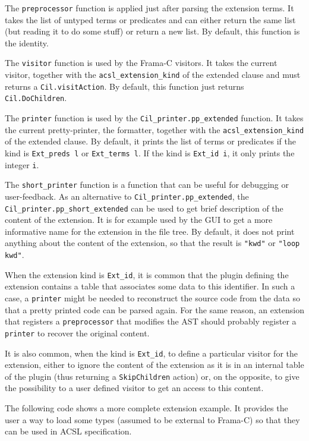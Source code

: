 The \verb|preprocessor| function is applied just after parsing the extension
terms. It takes the list of untyped terms or predicates and can either return
the same list (but reading it to do some stuff) or return a new list. By
default, this function is the identity.

The \verb|visitor| function is used by the Frama-C visitors. It takes the
current visitor, together with the \verb|acsl_extension_kind| of the extended
clause and must returns a \verb|Cil.visitAction|. By default, this function
just returns \verb|Cil.DoChildren|.

The \verb|printer| function is used by the \verb|Cil_printer.pp_extended|
function. It takes the current pretty-printer, the formatter, together with
the \verb|acsl_extension_kind| of the extended clause. By default, it prints
the list of terms or predicates if the kind is \verb|Ext_preds l| or
\verb|Ext_terms l|. If the kind is \verb|Ext_id i|, it only prints the
integer \verb|i|.

The \verb|short_printer| function is a function that can be useful for
debugging or user-feedback. As an alternative to \verb|Cil_printer.pp_extended|,
the \verb|Cil_printer.pp_short_extended| can be used to get brief description
of the content of the extension. It is for example used by the GUI to get
a more informative name for the extension in the file tree. By default, it
does not print anything about the content of the extension, so that the
result is \verb|"kwd"| or \verb|"loop kwd"|.

When the extension kind is \verb|Ext_id|, it is common that the plugin
defining the extension contains a table that associates some data to this
identifier. In such a case, a \verb|printer| might be needed to reconstruct
the source code from the data so that a pretty printed code can be parsed
again. For the same reason, an extension that registers a \verb|preprocessor|
that modifies the AST should probably register a \verb|printer| to recover
the original content.

It is also common, when the kind is \verb|Ext_id|, to define a particular
visitor for the extension, either to ignore the content of the extension as
it is in an internal table of the plugin (thus returning a \verb|SkipChildren|
action) or, on the opposite, to give the possibility to a user defined visitor
to get an access to this content.

The following code shows a more complete extension example. It provides the
user a way to load some types (assumed to be external to Frama-C) so that they
can be used in ACSL specification.

